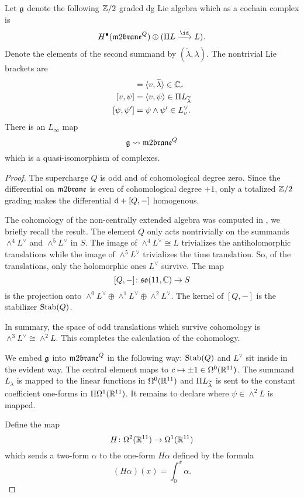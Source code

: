 \documentclass[11pt]{amsart}
\begin{document}
\begin{prop}
\label{prop:gmodel}
Let $\fg$ denote the following $\ZZ/2$ graded dg Lie algebra which as a cochain complex is
\[
H^\bu(\m2^Q) \oplus (\Pi L \xto{\id} L)  .
\]
Denote the elements of the second summand by $(\tilde{\lambda}, \lambda)$. 
The nontrivial Lie brackets are
\begin{align*}
[v,\lambda] & = \<v, \til\lambda\> \in \CC_c \\ 
[v,\psi] & = \<v, \psi\> \in \Pi L_{\Tilde{\lambda}} \\
[\psi, \psi'] & = \psi \wedge \psi' \in L^\vee_v  .
\end{align*}
There is an $L_\infty$ map 
\[
\fg \rightsquigarrow \m2^Q
\] 
which is a quasi-isomorphism of complexes.  
\end{prop}
\begin{proof}
The supercharge $Q$ is odd and of cohomological degree zero.
Since the differential on $\m2$ is even of cohomological degree $+1$, only a totalized $\ZZ/2$ grading makes the differential $\d + [Q,-]$ homogenous. 

The cohomology of the non-centrally extended algebra was computed in \cite{SWspinor}, we briefly recall the result. 
The element $Q$ only acts nontrivially on the summands $\wedge^4 L^\vee$ and $\wedge^5 L^\vee$ in $S$. 
The image of $\wedge^4 L^\vee \cong L$ trivializes the antiholomorphic translations while the image of $\wedge^5 L^\vee$ trivializes the time translation.
So, of the translations, only the holomorphic ones $L^\vee$ survive.
The map 
\[
[Q,-] \colon \lie{so}(11,\CC) \to S 
\] 
is the projection onto $\wedge^0 L^\vee \oplus \wedge^1 L^\vee \oplus \wedge^2 L^\vee$. 
The kernel of $[Q,-]$ is the stabilizer ${\rm Stab}(Q)$.

In summary, the space of odd translations which survive cohomology is $\wedge^3 L^\vee \cong \wedge^2 L$.
This completes the calculation of the cohomology. 

We embed $\fg$ into $\m2^Q$ in the following way: ${\rm Stab}(Q)$ and $L^\vee$ sit inside in the evident way.
The central element maps to $c \mapsto \pm 1 \in \Omega^0(\RR^{11})$.
The summand $L_\lambda$ is mapped to the linear functions in $\Omega^0(\RR^{11})$ and $\Pi L_{\Tilde{\lambda}}$ is sent to the constant coefficient one-forms in $\Pi \Omega^1(\RR^{11})$. 
It remains to declare where $\psi \in \wedge^2 L$ is mapped.

Define the map
\[
H \colon \Omega^2 (\RR^{11}) \to \Omega^1(\RR^{11})
\]
which sends a two-form $\alpha$ to the one-form $H \alpha$ defined by the formula
\[
(H \alpha) (x) = \int_0^x \alpha .
\]


\end{proof}
\end{document}
